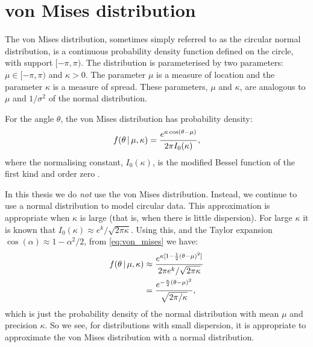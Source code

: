 \section{von Mises distribution}

The von Mises distribution, sometimes simply referred to as the circular normal
distribution, is a continuous probability density function defined on the circle, with
support $[-\pi, \pi)$. The distribution is parameterised by two parameters: $\mu \in
[-\pi, \pi)$ and $\kappa > 0$. The parameter $\mu$ is a measure of location and the
parameter $\kappa$ is a measure of spread. These parameters, $\mu$ and $\kappa$, are
analogous to $\mu$ and $1/\sigma^2$ of the normal distribution.

For the angle $\theta$, the von Mises distribution has probability density:
\begin{equation}
    \label{eq:von_mises}
	f(\theta \given \mu, \kappa) = \frac{e^{\kappa \cos(\theta - \mu)}}%
	                                    {2 \pi I_0(\kappa)},
\end{equation}
where the normalising constant, $I_0(\kappa)$, is the modified Bessel function of the
first kind and order zero \parencite{jammalamadaka01}.

In this thesis we do \emph{not} use the von Mises distribution. Instead, we continue to
use a normal distribution to model circular data. This approximation is
appropriate when $\kappa$ is large (that is, when there is
little dispersion). For large $\kappa$ it is known that $I_0(\kappa) \approx e^k /
\sqrt{2\pi\kappa}$. Using this, and the Taylor expansion $\cos(\alpha) \approx 1 -
\alpha^2/2$, from \cref{eq:von_mises} we have:
\begin{align*}
    f(\theta \given \mu, \kappa) &\approx \frac{e^{\kappa[1-\frac{1}{2}(\theta-\mu)^2]}}%
                                               {2\pi e^k / \sqrt{2\pi\kappa}}\\
                                 & = \frac{e^{-\frac{\kappa}{2}(\theta-\mu)^2}}%
                                          {\sqrt{2\pi/\kappa}},
\end{align*}
which is just the probability density of the normal distribution with mean $\mu$ and precision
$\kappa$. So we see, for distributions with small dispersion, it is appropriate to
approximate the von Mises distribution with a normal distribution.
